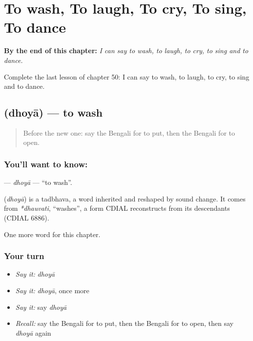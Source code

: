 
\chapter{To wash, To laugh, To cry, To sing, To dance}
\label{ch:bn-to-wash-to-laugh-to-cry-to-sing-to-dance}

\begin{chapteropening}
\textbf{By the end of this chapter:} \emph{I can say to wash, to laugh, to cry, to sing and to dance.}

Complete the last lesson of chapter 50: I can say to wash, to laugh, to cry, to sing and to dance.
\end{chapteropening}

\section[\texorpdfstring{\bn{ধোয়া} (dhoyā)}{ধোয়া (dhoyā)}]{ (dhoyā) — to wash}

\label{lesson:BN-C50-dhoya}



\begin{quote}
Before the new one: say the Bengali for to put, then the Bengali for to open.
\end{quote}

\subsection*{You'll want to know: }
\textbf{} — \emph{dhoyā} — \textquotedblleft{}to wash\textquotedblright{}.

\begin{cousinweb}
\textbf{} (\emph{dhoyā}) is a tadbhava, a word inherited and reshaped by sound change. It comes from \emph{*dhauvati}, \textquotedblleft{}washes\textquotedblright{}, a form CDIAL reconstructs from its descendants (CDIAL 6886).
\end{cousinweb}

\begin{grammarlens}[title={What you've built}]
One more word for this chapter.
\end{grammarlens}

\subsection*{Your turn}
\begin{itemize}
\raggedright
  \item \emph{Say it:} \emph{dhoyā}
  \item \emph{Say it:} \emph{dhoyā}, once more
  \item \emph{Say it:} say \emph{dhoyā}
  \item \emph{Recall:} say the Bengali for to put, then the Bengali for to open, then say \emph{dhoyā} again
\end{itemize}

